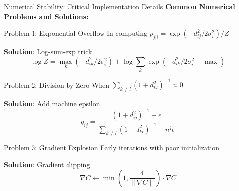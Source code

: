 \documentclass[aspectratio=169]{beamer}
\begin{document}
\begin{frame}{Numerical Stability: Critical Implementation Details}
\textbf{Common Numerical Problems and Solutions:}

\begin{block}{Problem 1: Exponential Overflow}
In computing $p_{j|i} = \exp(-d_{ij}^2/2\sigma_i^2) / Z$

\textbf{Solution:} Log-sum-exp trick
$$\log Z = \max_k(-d_{ik}^2/2\sigma_i^2) + \log\sum_k \exp(-d_{ik}^2/2\sigma_i^2 - \max)$$
\end{block}

\begin{block}{Problem 2: Division by Zero}
When $\sum_{k \neq l}(1 + d_{kl}^2)^{-1} \approx 0$

\textbf{Solution:} Add machine epsilon
$$q_{ij} = \frac{(1 + d_{ij}^2)^{-1} + \epsilon}{\sum_{k \neq l}(1 + d_{kl}^2)^{-1} + n^2\epsilon}$$
\end{block}

\begin{block}{Problem 3: Gradient Explosion}
Early iterations with poor initialization

\textbf{Solution:} Gradient clipping
$$\nabla C \leftarrow \min\left(1, \frac{4}{\|\nabla C\|}\right) \cdot \nabla C$$
\end{block}
\end{frame}
\end{document}
